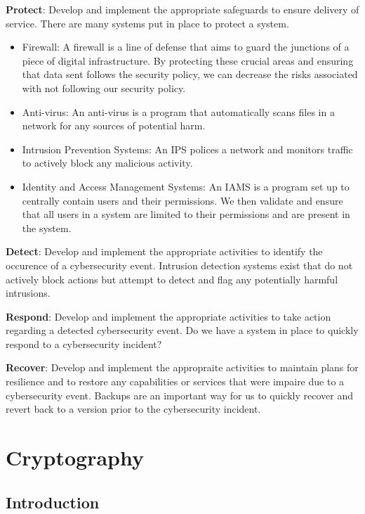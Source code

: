 \documentclass[11pt]{article}
\begin{document}
\textbf{Protect}: Develop and implement the appropriate safeguards to ensure delivery of service.
There are many systems put in place to protect a system.
\begin{itemize}
    \item Firewall: A firewall is a line of defense that aims to guard the junctions of a piece of digital infrastructure. 
          By protecting these crucial areas and ensuring that data sent follows the security policy, we can decrease the risks associated with not following our security policy.
    \item Anti-virus: An anti-virus is a program that automatically scans files in a network for any sources of potential harm.
    \item Intrusion Prevention Systems: An IPS polices a network and monitors traffic to actively block any malicious activity.
    \item Identity and Access Management Systems: An IAMS is a program set up to centrally contain users and their permissions. 
          We then validate and ensure that all users in a system are limited to their permissions and are present in the system.
\end{itemize}

\textbf{Detect}: Develop and implement the appropriate activities to identify the occurence of a cybersecurity event.
Intrusion detection systems exist that do not actively block actions but attempt to detect and flag any potentially harmful intrusions.

\textbf{Respond}: Develop and implement the appropriate activities to take action regarding a detected cybersecurity event.
Do we have a system in place to quickly respond to a cybersecurity incident?

\textbf{Recover}: Develop and implement the appropraite activities to maintain plans for resilience and to restore any capabilities or services that were impaire due to a cybersecurity event.
Backups are an important way for us to quickly recover and revert back to a version prior to the cybersecurity incident.

\section{Cryptography}

\subsection{Introduction}
\end{document}
